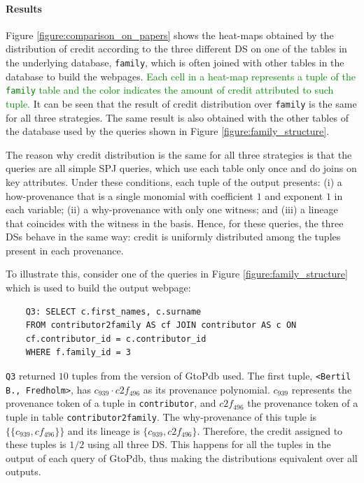\paragraph{Results} Figure \ref{figure:comparison_on_papers} shows the heat-maps obtained by the distribution of credit according to the three different DS on one of the tables in the underlying database, \texttt{family}, 
which is often joined with other tables in the database to build the webpages. \textcolor{green}{Each cell in a heat-map represents a tuple of the \texttt{family} table and the color indicates the amount of credit attributed to such tuple.}
It can be seen that the result of  credit distribution over \texttt{family} is the same for all three strategies. The same result is also obtained with the other tables of the database used by the queries shown in Figure \ref{figure:family_structure}. 

The reason why credit distribution is the same for all three strategies is that the queries are all simple SPJ queries, which use each table only once and do joins on key attributes. 
Under these conditions, each tuple of the output presents: (i) a how-provenance that is a single monomial with coefficient $1$ and exponent $1$ in each variable; (ii) a why-provenance with only one witness; and (iii) a lineage that coincides with the witness in the basis.
Hence, for these queries, the three DSs behave in the same way: credit is uniformly distributed among the tuples present in each provenance. 

To illustrate this, consider one of the queries in Figure \ref{figure:family_structure} which is used to build the output webpage:

\vspace{2mm}
{\footnotesize
\begin{adjustwidth}{25pt}{5pt}
	\begin{verbatim}
	Q3: SELECT c.first_names, c.surname
	FROM contributor2family AS cf JOIN contributor AS c ON 
	cf.contributor_id = c.contributor_id 
	WHERE f.family_id = 3
\end{verbatim}
\end{adjustwidth}
}
\vspace{2mm}

\texttt{Q3} returned $10$ tuples from the version of GtoPdb used. 
The first tuple, \texttt{<Bertil B., Fredholm>}, has  $c_{939} \cdot c2f_{496}$ as its provenance polynomial.
$c_{939}$ represents the provenance token of a tuple in \texttt{contributor}, and $c2f_{496}$ the provenance token of a tuple in table \texttt{contributor2family}. 
The why-provenance of this tuple is $\{\{c_{939}, cf_{496} \}\}$ and its lineage is $\{c_{939}, c2f_{496} \}$.
Therefore, the credit assigned to these tuples is $1/2$ using all three DS.
This happens for all the tuples in the output of each query of GtoPdb, thus making the distributions equivalent over all outputs.

